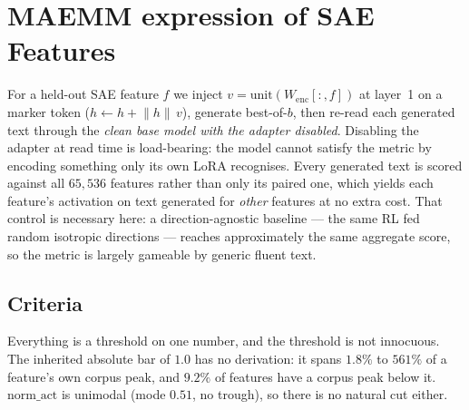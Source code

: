 
\section{MAEMM expression of SAE Features}
\label{app:verb}

For a held-out SAE feature $f$ we inject $v = \mathrm{unit}(W_{\mathrm{enc}}[:,f])$ at layer~1 on a
marker token ($h \leftarrow h + \lVert h \rVert \, v$), generate best-of-$b$, then re-read each
generated text through the \emph{clean base model with the adapter disabled}. Disabling the adapter
at read time is load-bearing: the model cannot satisfy the metric by encoding something only its own
LoRA recognises. Every generated text is scored against all $65{,}536$ features rather than only its
paired one, which yields each feature's activation on text generated for \emph{other} features at no
extra cost. That control is necessary here: a direction-agnostic baseline --- the same RL fed random
isotropic directions --- reaches approximately the same aggregate score, so the metric is largely
gameable by generic fluent text.

\subsection{Criteria}
\label{app:verb-measure}

Everything is a threshold on one number, and the threshold is not innocuous. The inherited absolute
bar of $1.0$ has no derivation: it spans $1.8\%$ to $561\%$ of a feature's own corpus peak, and
$9.2\%$ of features have a corpus peak below it. $\mathrm{norm\_act}$ is unimodal (mode $0.51$, no
trough), so there is no natural cut either.

